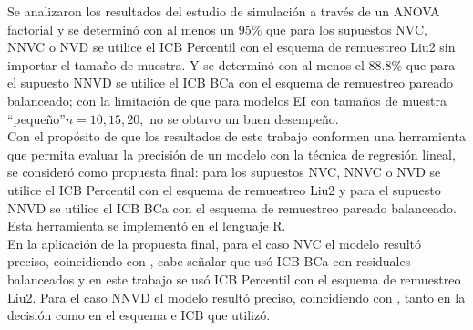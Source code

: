 Se analizaron los resultados del estudio de simulación a través de un ANOVA factorial y se determinó con al menos un 95\% que para los supuestos NVC, NNVC o NVD se utilice el ICB Percentil con el esquema de remuestreo Liu2 sin importar el tamaño de muestra. Y se determinó con al menos el 88.8\% que para el supuesto NNVD se utilice el ICB BCa con el esquema de remuestreo pareado balanceado; con la limitación de que para modelos EI con tamaños de muestra “pequeño”$ n=10, 15, 20,$ no se obtuvo un buen desempeño.\\


Con el propósito de que los resultados de este trabajo conformen una herramienta que permita evaluar la precisión de un modelo con la técnica de regresión lineal, se consideró como propuesta final: para los supuestos NVC, NNVC o NVD se utilice el ICB Percentil con el esquema de remuestreo Liu2 y para el supuesto NNVD se utilice el ICB BCa con el esquema de remuestreo pareado balanceado. Esta herramienta se implementó en el lenguaje R.\\


En la aplicación de la propuesta final, para el caso NVC el modelo resultó preciso, coincidiendo con \textcite{balam-2012}, cabe señalar que usó ICB BCa con residuales balanceados y en este trabajo se usó ICB Percentil con el esquema de remuestreo Liu2. Para el caso NNVD el modelo resultó preciso, coincidiendo con \textcite{balam-2012}, tanto en la decisión como en el esquema e ICB que utilizó.



